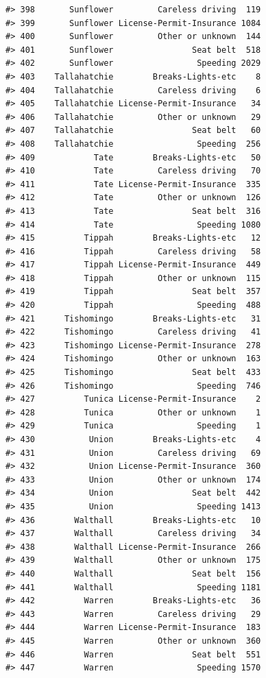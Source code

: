 \documentclass[
]{book}
\begin{document}
\begin{verbatim}
#> 398       Sunflower         Careless driving  119
#> 399       Sunflower License-Permit-Insurance 1084
#> 400       Sunflower         Other or unknown  144
#> 401       Sunflower                Seat belt  518
#> 402       Sunflower                 Speeding 2029
#> 403    Tallahatchie        Breaks-Lights-etc    8
#> 404    Tallahatchie         Careless driving    6
#> 405    Tallahatchie License-Permit-Insurance   34
#> 406    Tallahatchie         Other or unknown   29
#> 407    Tallahatchie                Seat belt   60
#> 408    Tallahatchie                 Speeding  256
#> 409            Tate        Breaks-Lights-etc   50
#> 410            Tate         Careless driving   70
#> 411            Tate License-Permit-Insurance  335
#> 412            Tate         Other or unknown  126
#> 413            Tate                Seat belt  316
#> 414            Tate                 Speeding 1080
#> 415          Tippah        Breaks-Lights-etc   12
#> 416          Tippah         Careless driving   58
#> 417          Tippah License-Permit-Insurance  449
#> 418          Tippah         Other or unknown  115
#> 419          Tippah                Seat belt  357
#> 420          Tippah                 Speeding  488
#> 421      Tishomingo        Breaks-Lights-etc   31
#> 422      Tishomingo         Careless driving   41
#> 423      Tishomingo License-Permit-Insurance  278
#> 424      Tishomingo         Other or unknown  163
#> 425      Tishomingo                Seat belt  433
#> 426      Tishomingo                 Speeding  746
#> 427          Tunica License-Permit-Insurance    2
#> 428          Tunica         Other or unknown    1
#> 429          Tunica                 Speeding    1
#> 430           Union        Breaks-Lights-etc    4
#> 431           Union         Careless driving   69
#> 432           Union License-Permit-Insurance  360
#> 433           Union         Other or unknown  174
#> 434           Union                Seat belt  442
#> 435           Union                 Speeding 1413
#> 436        Walthall        Breaks-Lights-etc   10
#> 437        Walthall         Careless driving   34
#> 438        Walthall License-Permit-Insurance  266
#> 439        Walthall         Other or unknown  175
#> 440        Walthall                Seat belt  156
#> 441        Walthall                 Speeding 1181
#> 442          Warren        Breaks-Lights-etc   36
#> 443          Warren         Careless driving   29
#> 444          Warren License-Permit-Insurance  183
#> 445          Warren         Other or unknown  360
#> 446          Warren                Seat belt  551
#> 447          Warren                 Speeding 1570

\end{verbatim}
\end{document}
